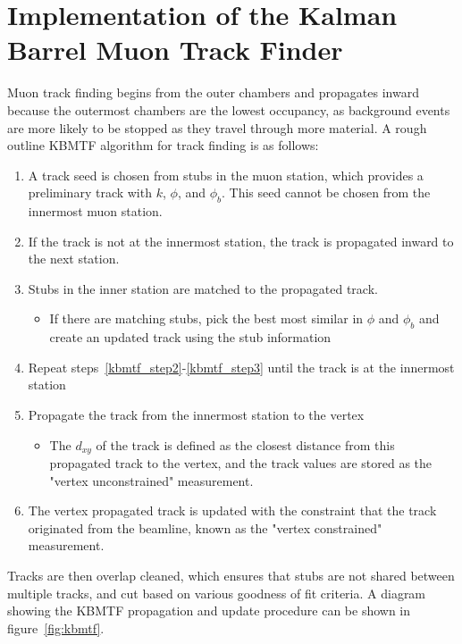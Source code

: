 \section{Implementation of the Kalman Barrel Muon Track Finder} \label{sec:kbmtf}
Muon track finding begins from the outer chambers and propagates inward because the outermost chambers are the lowest occupancy, as background events are more likely to be stopped as they travel through more material. A rough outline KBMTF algorithm for track finding is as follows:
\begin{enumerate}
	\item A track seed is chosen from stubs in the muon station, which provides a preliminary track with $k$, $\phi$, and $\phi_{b}$. This seed cannot be chosen from the innermost muon station.
	\item If the track is not at the innermost station, the track is propagated inward to the next station. \label{kbmtf_step2}
	\item Stubs in the inner station are matched to the propagated track. \label{kbmtf_step3}
	\begin{itemize}
		\item If there are matching stubs, pick the best most similar in $\phi$ and $\phi_b$ and create an updated track using the stub information
	\end{itemize}
	\item Repeat steps~\ref{kbmtf_step2}-\ref{kbmtf_step3} until the track is at the innermost station
	\item Propagate the track from the innermost station to the vertex
	\begin{itemize}
		\item The $d_{xy}$ of the track is defined as the closest distance from this propagated track to the vertex, and the track values are stored as the "vertex unconstrained" measurement.
	\end{itemize} \label{kbmtf_step4}
	\item The vertex propagated track is updated with the constraint that the track originated from the beamline, known as the "vertex constrained" measurement. \label{kbmtf_step5}
\end{enumerate}

Tracks are then overlap cleaned, which ensures that stubs are not shared between multiple tracks, and cut based on various goodness of fit criteria. A diagram showing the KBMTF propagation and update procedure can be shown in figure~\ref{fig:kbmtf}.

